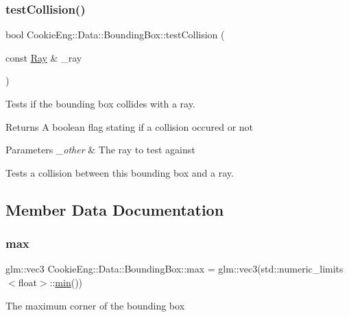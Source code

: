 \subsubsection{\texorpdfstring{test\+Collision()}{testCollision()}\hspace{0.1cm}{\footnotesize\ttfamily [2/2]}}
{\footnotesize\ttfamily bool Cookie\+Eng\+::\+Data\+::\+Bounding\+Box\+::test\+Collision (\begin{DoxyParamCaption}\item[{const \hyperlink{struct_cookie_eng_1_1_data_1_1_ray}{Ray} \&}]{\+\_\+ray }\end{DoxyParamCaption})\hspace{0.3cm}{\ttfamily [inline]}}



Tests if the bounding box collides with a ray. 

\begin{DoxyReturn}{Returns}
A boolean flag stating if a collision occured or not 
\end{DoxyReturn}

\begin{DoxyParams}{Parameters}
{\em \+\_\+other} & The ray to test against\\
\hline
\end{DoxyParams}
Tests a collision between \textquotesingle{}this\textquotesingle{} bounding box and a ray. 

\subsection{Member Data Documentation}
\mbox{\label{class_cookie_eng_1_1_data_1_1_bounding_box_a67a8ab24fefc25d92bd154273ee72e95}} 
\subsubsection{\texorpdfstring{max}{max}}
{\footnotesize\ttfamily glm\+::vec3 Cookie\+Eng\+::\+Data\+::\+Bounding\+Box\+::max = glm\+::vec3(std\+::numeric\+\_\+limits$<$float$>$\+::\hyperlink{class_cookie_eng_1_1_data_1_1_bounding_box_ad7e51530c82882e0606c0b63d27fd6e5}{min}())}

The maximum corner of the bounding box \mbox{\label{class_cookie_eng_1_1_data_1_1_bounding_box_ad7e51530c82882e0606c0b63d27fd6e5}} 
